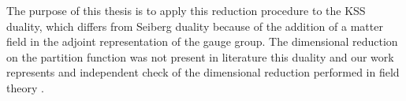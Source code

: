 \documentclass[a4paper,12pt]{article}
\begin{document}
The purpose of this thesis is to apply this reduction procedure to the KSS duality, which differs from Seiberg duality because of the addition of a matter field in the adjoint representation of the gauge group.
The dimensional reduction on the partition function was not present in literature  this duality and our work represents and independent check of the dimensional reduction performed in field theory .
\end{document}
